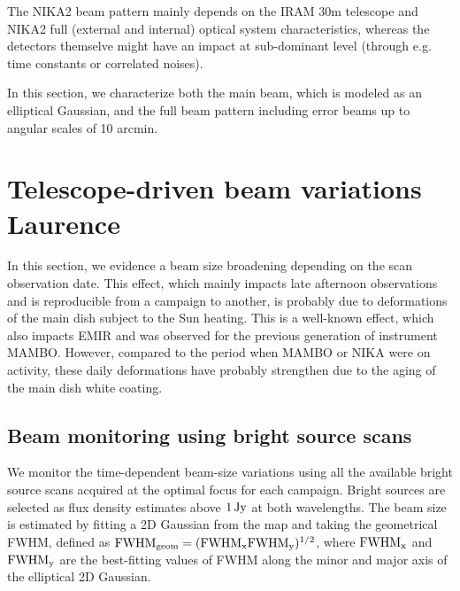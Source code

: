 

The NIKA2 beam pattern mainly depends on the IRAM 30m telescope and
NIKA2 full (external and internal) optical system characteristics,
whereas the detectors themselve might have an impact at sub-dominant
level (through e.g. time constants or correlated noises).

In this section, we characterize both the main beam, which is
modeled as an elliptical Gaussian, and the full beam pattern including
error beams up to angular scales of 10 arcmin.

\section{Telescope-driven beam variations {\color{blue} Laurence}}
\label{se:obsdate_variations}

In this section, we evidence a beam size broadening depending on the
scan observation date. This effect, which mainly impacts late
afternoon observations and is reproducible from a campaign to another,
is probably due to deformations of the main dish subject to the Sun
heating. This is a well-known effect, which also impacts EMIR and was
observed for the previous generation of instrument MAMBO. However,
compared to the period when MAMBO or NIKA were on activity, these
daily deformations have probably strengthen due to the aging of the
main dish white coating.

\subsection{Beam monitoring using bright source scans}

We monitor the time-dependent beam-size variations using all the
available bright source scans acquired at the optimal focus for each
campaign. Bright sources are selected as flux density
estimates above $1\,\rm{Jy}$ at both wavelengths.
The beam size is estimated by fitting a 2D Gaussian from the map and
taking the geometrical FWHM, defined as 
$\rm{FWHM}_{\rm{geom}} = (\rm{FWHM}_x \rm{FWHM}_y)^{1/2}$, where
$\rm{FWHM}_x$ and $\rm{FWHM}_y$ are the best-fitting values of FWHM
along the minor and major axis of the elliptical 2D Gaussian.


